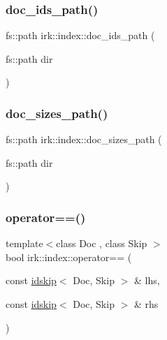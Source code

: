 \mbox{\label{namespaceirk_1_1index_a1680416c227181a5ab2f0b0169adb11e}} 
\subsubsection{\texorpdfstring{doc\+\_\+ids\+\_\+path()}{doc\_ids\_path()}}
{\footnotesize\ttfamily fs\+::path irk\+::index\+::doc\+\_\+ids\+\_\+path (\begin{DoxyParamCaption}\item[{fs\+::path}]{dir }\end{DoxyParamCaption})}

\mbox{\label{namespaceirk_1_1index_a823e8c1206224466802b3cee4c138c8a}} 
\subsubsection{\texorpdfstring{doc\+\_\+sizes\+\_\+path()}{doc\_sizes\_path()}}
{\footnotesize\ttfamily fs\+::path irk\+::index\+::doc\+\_\+sizes\+\_\+path (\begin{DoxyParamCaption}\item[{fs\+::path}]{dir }\end{DoxyParamCaption})}

\mbox{\label{namespaceirk_1_1index_abd8c6907b919343282e10fd76dec4dba}} 
\subsubsection{\texorpdfstring{operator==()}{operator==()}}
{\footnotesize\ttfamily template$<$class Doc , class Skip $>$ \\
bool irk\+::index\+::operator== (\begin{DoxyParamCaption}\item[{const \mbox{\hyperlink{structirk_1_1index_1_1idskip}{idskip}}$<$ Doc, Skip $>$ \&}]{lhs,  }\item[{const \mbox{\hyperlink{structirk_1_1index_1_1idskip}{idskip}}$<$ Doc, Skip $>$ \&}]{rhs }\end{DoxyParamCaption})}


